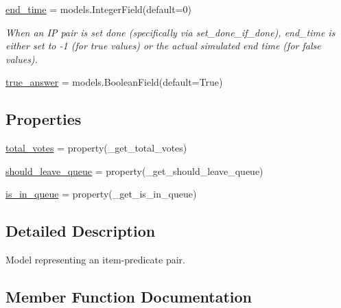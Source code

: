 \begin{DoxyCompactItemize}
\item 
\mbox{\hyperlink{classdynamicfilterapp_1_1models_1_1_i_p___pair_aa18736cc12f8beb112bd108c5a09ef8d}{end\+\_\+time}} = models.\+Integer\+Field(default=0)
\begin{DoxyCompactList}\small\item\em When an IP pair is set done (specifically via set\+\_\+done\+\_\+if\+\_\+done), end\+\_\+time is either set to -\/1 (for true values) or the actual simulated end time (for false values). \end{DoxyCompactList}\item 
\mbox{\hyperlink{classdynamicfilterapp_1_1models_1_1_i_p___pair_ab1306c9f450db4ef7220faa3842affa7}{true\+\_\+answer}} = models.\+Boolean\+Field(default=True)
\end{DoxyCompactItemize}
\subsection*{Properties}
\begin{DoxyCompactItemize}
\item 
\mbox{\hyperlink{classdynamicfilterapp_1_1models_1_1_i_p___pair_a6de192eaff22c17d7eba33f9846d5cc3}{total\+\_\+votes}} = property(\+\_\+get\+\_\+total\+\_\+votes)
\item 
\mbox{\hyperlink{classdynamicfilterapp_1_1models_1_1_i_p___pair_a63cbe78a2b2e4520b738f01642954f9c}{should\+\_\+leave\+\_\+queue}} = property(\+\_\+get\+\_\+should\+\_\+leave\+\_\+queue)
\item 
\mbox{\hyperlink{classdynamicfilterapp_1_1models_1_1_i_p___pair_aa3c0cb873f3a4737bc2c357226618928}{is\+\_\+in\+\_\+queue}} = property(\+\_\+get\+\_\+is\+\_\+in\+\_\+queue)
\end{DoxyCompactItemize}


\subsection{Detailed Description}
\begin{DoxyVerb}Model representing an item-predicate pair.
\end{DoxyVerb}
 

\subsection{Member Function Documentation}
\mbox{\label{classdynamicfilterapp_1_1models_1_1_i_p___pair_a23e8041ce1015febe4fdace3225714f9}} 
